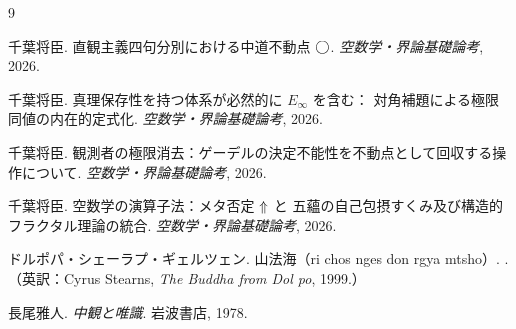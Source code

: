 \documentclass[11pt,a4paper]{article}
\theoremstyle{definition}
\begin{document}
\begin{thebibliography}{9}

千葉将臣.
\newblock 直観主義四句分別における中道不動点 $\bigcirc$.
\newblock \emph{空数学・界論基礎論考}, 2026.

千葉将臣.
\newblock 真理保存性を持つ体系が必然的に $E_\infty$ を含む：
対角補題による極限同値の内在的定式化.
\newblock \emph{空数学・界論基礎論考}, 2026.

千葉将臣.
\newblock 観測者の極限消去：ゲーデルの決定不能性を不動点として回収する操作について.
\newblock \emph{空数学・界論基礎論考}, 2026.

千葉将臣.
\newblock 空数学の演算子法：メタ否定 $\Uparrow$ と
五蘊の自己包摂すくみ及び構造的フラクタル理論の統合.
\newblock \emph{空数学・界論基礎論考}, 2026.

ドルポパ・シェーラプ・ギェルツェン.
\newblock 山法海（ri chos nges don rgya mtsho）.
.
\newblock （英訳：Cyrus Stearns, \emph{The Buddha from Dol po}, 1999.）

長尾雅人.
\newblock \emph{中観と唯識}.
\newblock 岩波書店, 1978.

\end{thebibliography}
\end{document}
